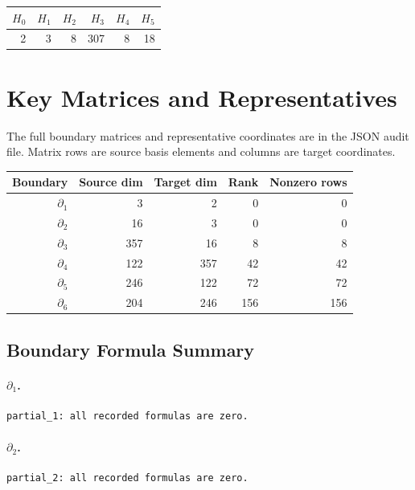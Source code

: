 \documentclass[11pt]{article}
\begin{document}
\begin{center}
\begin{tabular}{rrrrrr}
\toprule
\(H_0\) & \(H_1\) & \(H_2\) & \(H_3\) & \(H_4\) & \(H_5\) \\
\midrule
2 & 3 & 8 & 307 & 8 & 18 \\
\bottomrule
\end{tabular}
\end{center}

\section{Key Matrices and Representatives}
The full boundary matrices and representative coordinates are in the JSON audit file.  Matrix rows are source basis elements and columns are target coordinates.

\begin{center}
\begin{tabular}{rrrrr}
\toprule
Boundary & Source dim & Target dim & Rank & Nonzero rows \\
\midrule
\(\partial_1\) & 3 & 2 & 0 & 0 \\
\(\partial_2\) & 16 & 3 & 0 & 0 \\
\(\partial_3\) & 357 & 16 & 8 & 8 \\
\(\partial_4\) & 122 & 357 & 42 & 42 \\
\(\partial_5\) & 246 & 122 & 72 & 72 \\
\(\partial_6\) & 204 & 246 & 156 & 156 \\
\bottomrule
\end{tabular}
\end{center}

\subsection{Boundary Formula Summary}
\paragraph{\(\partial_1\).}
\begin{verbatim}
partial_1: all recorded formulas are zero.
\end{verbatim}
\paragraph{\(\partial_2\).}
\begin{verbatim}
partial_2: all recorded formulas are zero.
\end{verbatim}
\end{document}
